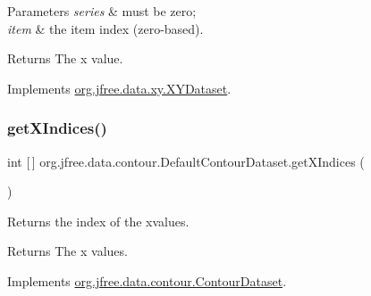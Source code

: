 \begin{DoxyParams}{Parameters}
{\em series} & must be zero; \\
\hline
{\em item} & the item index (zero-\/based).\\
\hline
\end{DoxyParams}
\begin{DoxyReturn}{Returns}
The x value. 
\end{DoxyReturn}


Implements \mbox{\hyperlink{interfaceorg_1_1jfree_1_1data_1_1xy_1_1_x_y_dataset_a85c75ba5b69b551e96afd29d1732ba22}{org.\+jfree.\+data.\+xy.\+X\+Y\+Dataset}}.

\mbox{\label{classorg_1_1jfree_1_1data_1_1contour_1_1_default_contour_dataset_a69fe875df187cabb1860f0ed79934d85}} 
\subsubsection{\texorpdfstring{get\+X\+Indices()}{getXIndices()}}
{\footnotesize\ttfamily int \mbox{[}$\,$\mbox{]} org.\+jfree.\+data.\+contour.\+Default\+Contour\+Dataset.\+get\+X\+Indices (\begin{DoxyParamCaption}{ }\end{DoxyParamCaption})}

Returns the index of the xvalues.

\begin{DoxyReturn}{Returns}
The x values. 
\end{DoxyReturn}


Implements \mbox{\hyperlink{interfaceorg_1_1jfree_1_1data_1_1contour_1_1_contour_dataset_a7f341ba05202db3970ec479b1ef1a999}{org.\+jfree.\+data.\+contour.\+Contour\+Dataset}}.

\mbox{\label{classorg_1_1jfree_1_1data_1_1contour_1_1_default_contour_dataset_ad62b4e62c2b80a704db8af964ffa0409}} 
